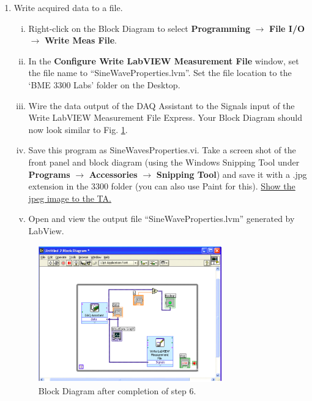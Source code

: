 \documentclass[12pt]{article}
\begin{document}
\begin{enumerate}[1.]
	\item Write acquired data to a file.
	\begin{enumerate}[i.]
		\item Right-click on the Block Diagram to select {\bf Programming} $\rightarrow$ {\bf File I/O} $\rightarrow$ {\bf Write Meas File}.
		\item In the {\bf Configure Write LabVIEW Measurement File} window, set the file name to ``SineWaveProperties.lvm''. Set the file location to the `BME 3300 Labs' folder on the Desktop.
		\item Wire the data output of the DAQ Assistant to the Signals input of the Write LabVIEW Measurement File Express. Your Block Diagram should now look similar to Fig. \ref{fig:5}.
		\item Save this program as SineWavesProperties.vi. Take a screen shot of the front panel and block diagram (using the Windows Snipping Tool under {\bf Programs} $\rightarrow$ {\bf Accessories} $\rightarrow$ {\bf Snipping Tool}) and save it with a .jpg extension in the 3300 folder (you can also use Paint for this). \underline{Show the jpeg image to the TA.}
		\item Open and view the output file ``SineWaveProperties.lvm'' generated by LabView.
	\end{enumerate}
	
	\begin{figure}[!ht]
	\begin{center}
	\includegraphics[width=0.75\textwidth,trim=0 0 0 0,clip=false]{lab1fig5.png}
	\caption{Block Diagram after completion of step 6.}
	\label{fig:5}
	\end{center}
	\end{figure}
	
\end{enumerate}
\end{document}
